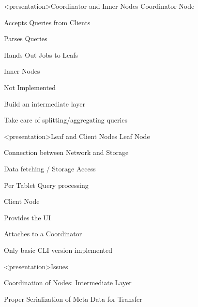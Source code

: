 \begin{frame}<presentation>{Coordinator and Inner Nodes}
  Coordinator Node
  \begin{niitemize}
    \item Accepts Queries from Clients
    \item Parses Queries
    \item Hands Out Jobs to Leafs
  \end{niitemize}
  Inner Nodes
  \begin{niitemize}
    \item Not Implemented
    \item Build an intermediate layer
    \item Take care of splitting/aggregating queries
  \end{niitemize}
\end{frame}

\begin{frame}<presentation>{Leaf and Client Nodes}
  Leaf Node
  \begin{niitemize}
    \item Connection between Network and Storage
    \item Data fetching / Storage Access
    \item Per Tablet Query processing
  \end{niitemize}
  Client Node
  \begin{niitemize}
    \item Provides the UI
    \item Attaches to a Coordinator
    \item Only basic CLI version implemented
  \end{niitemize}
\end{frame}


\begin{frame}<presentation>{Issues}
\begin{niitemize}
 \item Coordination of Nodes: Intermediate Layer
 \item Proper Serialization of Meta-Data for Transfer
\end{niitemize}
\end{frame}



